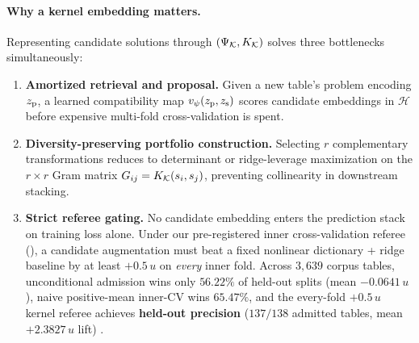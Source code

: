 \paragraph{Why a kernel embedding matters.}
Representing candidate solutions through $(\Psi_{\mathcal{K}}, K_{\mathcal{K}})$ solves three bottlenecks simultaneously:
\begin{enumerate}
  \item \textbf{Amortized retrieval and proposal.} Given a new table's problem encoding $z_{\mathrm{p}}$, a learned compatibility map $v_{\psi}(z_{\mathrm{p}}, z_{\mathrm{s}})$ scores candidate embeddings in $\mathcal{H}$ before expensive multi-fold cross-validation is spent.
  \item \textbf{Diversity-preserving portfolio construction.} Selecting $r$ complementary transformations reduces to determinant or ridge-leverage maximization on the $r \times r$ Gram matrix $G_{ij} = K_{\mathcal{K}}(s_i, s_j)$, preventing collinearity in downstream stacking.
  \item \textbf{Strict referee gating.} No candidate embedding enters the prediction stack on training loss alone. Under our pre-registered inner cross-validation referee (), a candidate augmentation must beat a fixed nonlinear dictionary + ridge baseline by at least $+0.5\,u$ on \emph{every} inner fold. Across $3{,}639$ corpus tables, unconditional admission wins only $56.22\%$ of held-out splits (mean $-0.0641\,u$), naive positive-mean inner-CV wins $65.47\%$, and the every-fold $+0.5\,u$ kernel referee achieves \textbf{\BHKernelGatePrec{} held-out precision} ($137/138$ admitted tables, mean $+2.3827\,u$ lift) \est{}.
\end{enumerate}
